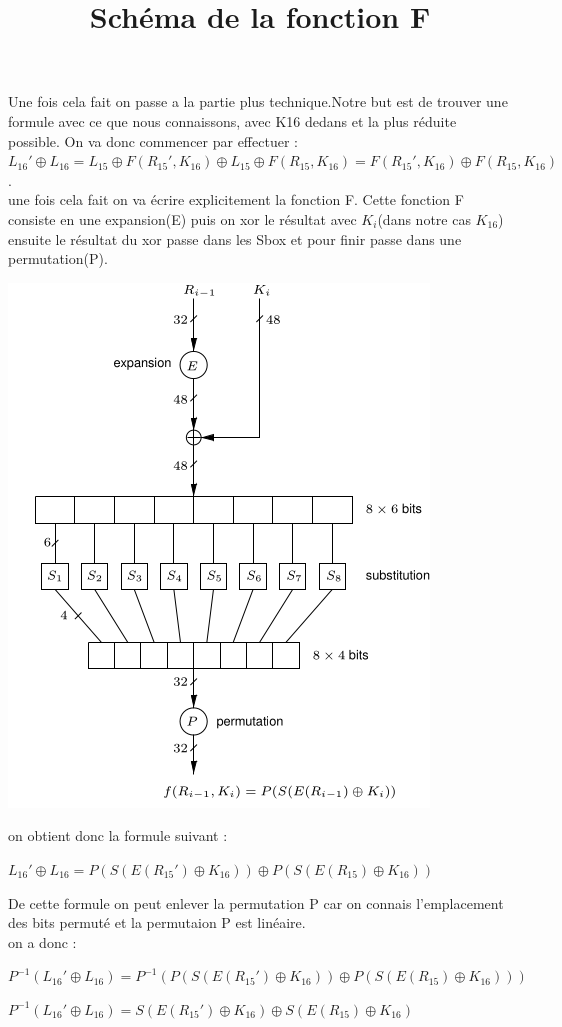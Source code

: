 \documentclass[a4paper]{report}
\begin{document}
			Une fois cela fait on passe a la partie plus technique.Notre but est de trouver une formule avec ce que nous connaissons, avec K16 dedans et la plus réduite possible.
			On va donc commencer par effectuer :\\
			$L_{16}'\oplus L_{16} = L_{15}\oplus F(R_{15}',K_{16}) \oplus L_{15}\oplus F(R_{15},K_{16}) =F(R_{15}',K_{16})\oplus F(R_{15},K_{16})$.\\
			
			une fois cela fait on va écrire explicitement la fonction F. Cette fonction F consiste en une expansion(E) puis on xor le résultat avec $K_i$(dans notre cas $K_{16}$) ensuite le résultat du xor passe dans les Sbox et pour finir passe dans une permutation(P). 
			\begin{center}\includegraphics[scale=0.40]{Fonction_F.png}\end{center}
			\begin{center}\title{Schéma de la fonction F}\end{center}
			on obtient donc la formule suivant :
			\begin{center}$L_{16}'\oplus L_{16} = P(S(E(R_{15}')\oplus K_{16}))\oplus P(S(E(R_{15})\oplus K_{16})) $\end{center}
			
			De cette formule on peut enlever la permutation P car on connais l'emplacement des bits permuté et la permutaion P est linéaire.\\
			on a donc :
			\begin{center}$P^{-1}(L_{16}'\oplus L_{16}) =P^{-1}( P(S(E(R_{15}')\oplus K_{16}))\oplus P(S(E(R_{15})\oplus K_{16}))) $\end{center}
			\begin{center}$P^{-1}(L_{16}'\oplus L_{16}) =S(E(R_{15}')\oplus K_{16})\oplus S(E(R_{15})\oplus K_{16}) $\end{center}
			
\end{document}
